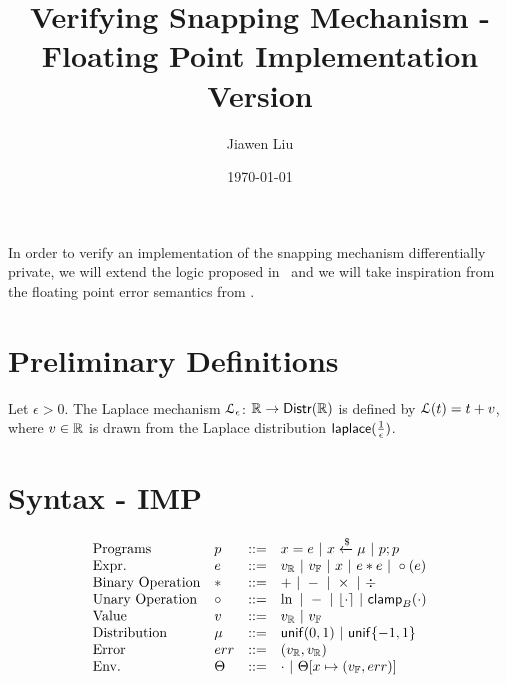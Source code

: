 \documentclass[a4paper,11pt]{article}
\begin{document}
\title{Verifying Snapping Mechanism - Floating Point Implementation Version}
\author{Jiawen Liu}

\date{\today}

\maketitle
In order to verify an implementation of the snapping mechanism
\cite{mironov2012significance} differentially private, we will extend
the logic proposed in~\cite{barthe2016proving} and we will take
inspiration from the floating
point error semantics from
\cite{Ramananandro2016unified,Martel2006higher,Becker2018verified,Moscato2017Automatic}.

\section{Preliminary Definitions}
\begin{defn}
Let $\epsilon > 0$. The Laplace mechanism  $\mathcal{L}_{\epsilon}$: $\mathbb{R} \to \mathsf{Distr}(\mathbb{R})$ is defined by $\mathcal{L}(t) = t + v$, where $v \in \mathbb{R}$ is drawn from the Laplace distribution $\mathsf{laplace}(\frac{1}{\epsilon})$.
\end{defn}
%
%
%

\section{Syntax - IMP}
\[
\begin{array}{llll}
\mbox{Programs} & \prog & ::= & 
     \varx = \expr ~|~ \varx \samplel \edistr
	~|~ \prog ; \prog \\

\mbox{Expr.} & \expr & ::= & \rval ~|~  \fval
	~|~ \varx  ~|~ \expr \bop \expr
	~|~ \uop (\expr) \\
%
\mbox{Binary Operation} & \bop & ::= & + ~|~ - ~|~ \times ~|~ \div \\
%
\mbox{Unary Operation} & \uop & ::= & \ln ~|~ - ~|~ \round{\cdot} 
	~|~ \clamp_B(\cdot) \\
%
\mbox{Value} & \valv & ::= & \rval ~|~  \fval \\
%
\mbox{Distribution} & \edistr & ::= & \uniform(0, 1) 
%
	~|~ \uniform\{-1, 1\}\\ 
%
\mbox{Error} & \err & ::= & (\rval, \rval) \\
%
\mbox{Env.} & \trsenv & ::= & \cdot ~|~ \trsenv[x \mapsto (\fval, \err)] 
\end{array}
\]
\end{document}
